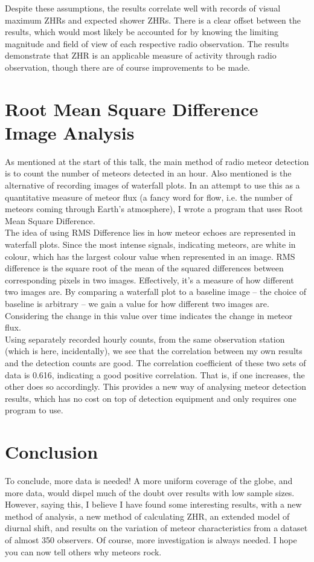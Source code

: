 \documentclass[12pt]{article}
\begin{document}
{Despite these assumptions, the results correlate well with records of visual
maximum ZHRs and expected shower ZHRs. There is a clear offset between the
results, which would most likely be accounted for by knowing the limiting
magnitude and field of view of each respective radio observation. The results
demonstrate that ZHR is an applicable measure of activity through radio
observation, though there are of course improvements to be made.\\
}

\section{Root Mean Square Difference Image Analysis}

\large{
As mentioned at the start of this talk, the main method of radio meteor
detection is to count the number of meteors detected in an hour. Also mentioned
is the alternative of recording images of waterfall plots. In an attempt to use
this as a quantitative measure of meteor flux (a fancy word for flow, i.e. the
number of meteors coming through Earth's atmosphere), I wrote a program that
uses Root Mean Square Difference.\\

The idea of using RMS Difference lies in how meteor echoes are represented in
waterfall plots. Since the most intense signals, indicating meteors, are white
in colour, which has the largest colour value when represented in an image. RMS
difference is the square root of the mean of the squared differences between
corresponding pixels in two images. Effectively, it's a measure of how
different two images are. By comparing a waterfall plot to a baseline image --
the choice of baseline is arbitrary -- we gain a value for how different two
images are.  Considering the change in this value over time indicates the
change in meteor flux.\\

Using separately recorded hourly counts, from the same observation station
(which is here, incidentally), we see that the correlation between
my own results and the detection counts are good. The correlation coefficient
of these two sets of data is 0.616, indicating a good positive correlation.
That is, if one increases, the other does so accordingly. This provides a new
way of analysing meteor detection results, which has no cost on top of
detection equipment and only requires one program to use. 
}

\section{Conclusion}

\large{
To conclude, more data is needed! A more uniform coverage of the globe, and
more data, would dispel much of the doubt over results with low sample sizes.
However, saying this, I believe I have found some interesting results, with a
new method of analysis, a new method of calculating ZHR, an extended model of
diurnal shift, and results on the variation of meteor characteristics from a
dataset of almost 350 observers. Of course, more investigation is always
needed. I hope you can now tell others why meteors rock.  
}
\end{document}

